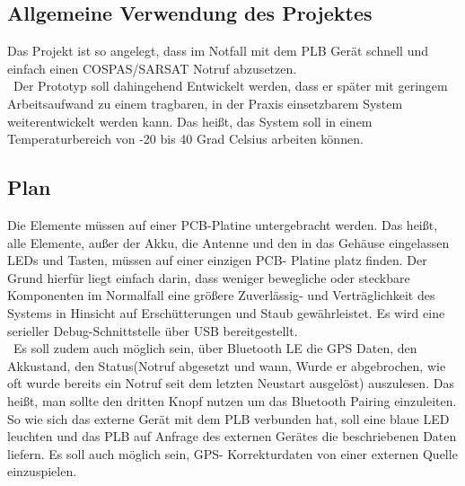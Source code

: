 \subsection{Allgemeine Verwendung des Projektes}
Das Projekt ist so angelegt, dass im Notfall mit dem PLB Gerät schnell und einfach einen COSPAS/SARSAT Notruf abzusetzen. \\\
Der Prototyp soll dahingehend Entwickelt werden, dass er später mit geringem Arbeitsaufwand zu einem tragbaren, in der Praxis einsetzbarem System weiterentwickelt werden kann.
Das heißt, das System soll in einem Temperaturbereich von -20 bis 40 Grad Celsius arbeiten können.
\subsection{Plan}
Die Elemente müssen auf einer PCB-Platine untergebracht werden. Das heißt, alle Elemente, außer der Akku, die Antenne und den in das Gehäuse eingelassen LEDs und Tasten, müssen auf einer einzigen PCB- Platine platz finden. Der Grund hierfür liegt einfach darin, dass weniger bewegliche oder steckbare Komponenten im Normalfall eine größere Zuverlässig- und Verträglichkeit des Systems in Hinsicht auf Erschütterungen und Staub gewährleistet. Es wird eine serieller Debug-Schnittstelle über USB bereitgestellt.\\\
Es soll zudem auch möglich sein, über Bluetooth LE die GPS Daten, den Akkustand, den Status(Notruf abgesetzt und wann, Wurde er abgebrochen, wie oft wurde bereits ein Notruf seit dem letzten Neustart ausgelöst) auszulesen. Das heißt, man sollte den dritten Knopf nutzen um das Bluetooth Pairing einzuleiten. So wie sich das externe Gerät mit dem PLB verbunden hat, soll eine blaue LED leuchten und das PLB auf Anfrage des externen Gerätes die beschriebenen Daten liefern. Es soll auch möglich sein, GPS- Korrekturdaten von einer externen Quelle einzuspielen.

